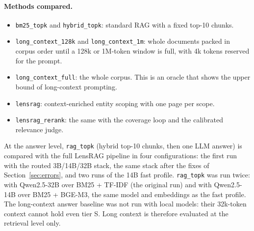 \documentclass[11pt,letterpaper,oneside]{report}
\begin{document}
\paragraph{Methods compared.}
\begin{itemize}
  \item \texttt{bm25\_topk} and \texttt{hybrid\_topk}: standard RAG with a
  fixed top-10 chunks.
  \item \texttt{long\_context\_128k} and \texttt{long\_context\_1m}: whole
  documents packed in corpus order until a 128k or 1M-token window is full,
  with 4k tokens reserved for the prompt.
  \item \texttt{long\_context\_full}: the whole corpus. This is an oracle
  that shows the upper bound of long-context prompting.
  \item \texttt{lensrag}: context-enriched entity scoping with one page per
  scope.
  \item \texttt{lensrag\_rerank}: the same with the coverage loop and the
  calibrated relevance judge.
\end{itemize}
At the answer level, \texttt{rag\_topk} (hybrid top-10 chunks, then one LLM
answer) is compared with the full LensRAG pipeline in four configurations:
the first run with the routed 3B/14B/32B stack, the same stack after the
fixes of Section~\ref{sec:errors}, and two runs of the 14B fast profile.
\texttt{rag\_topk} was run twice: with Qwen2.5-32B over BM25 + TF-IDF (the
original run) and with Qwen2.5-14B over BM25 + BGE-M3, the same model and
embeddings as the fast profile. The long-context answer
baseline was not run with local models: their 32k-token context cannot hold
even tier S. Long context is therefore evaluated at the retrieval level only.
\end{document}
